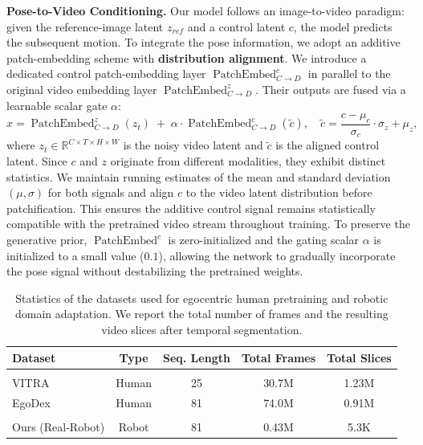\noindent \textbf{Pose-to-Video Conditioning.} 
Our model follows an image-to-video paradigm: given the reference-image latent $z_{ref}$ and a control latent $c$, the model predicts the subsequent motion. To integrate the pose information, we adopt an additive patch-embedding scheme with \textbf{distribution alignment}. We introduce a dedicated control patch-embedding layer $\operatorname{PatchEmbed}^{c}_{C \rightarrow D}$ in parallel to the original video embedding layer $\operatorname{PatchEmbed}^{z}_{C \rightarrow D}$. Their outputs are fused via a learnable scalar gate $\alpha$:
\begin{equation}                                                                        
x = \operatorname{PatchEmbed}^{z}_{C \rightarrow D}(z_t) \;+\; \alpha \cdot \operatorname{PatchEmbed}^{c}_{C \rightarrow D}\!\left(\widetilde{c}\right),\quad       
\widetilde{c} = \frac{c - \mu_c}{\sigma_c} \cdot \sigma_z + \mu_z,
\label{eq:patchify_addplus}                                                             
\end{equation}
where $z_t \in \mathbb{R}^{C \times T \times H \times W}$ is the noisy video latent and $\widetilde{c}$ is the aligned control latent. Since $c$ and $z$ originate from different modalities, they exhibit distinct statistics. We maintain running estimates of the mean and standard deviation $(\mu, \sigma)$ for both signals and align $c$ to the video latent distribution before patchification. This ensures the additive control signal remains statistically compatible with the pretrained video stream throughout training. To preserve the generative prior, $\operatorname{PatchEmbed}^{c}$ is zero-initialized and the gating scalar $\alpha$ is initialized to a small value (\eg $0.1$), allowing the network to gradually incorporate the pose signal without destabilizing the pretrained weights.



\begin{table}[t]
    \centering
    \caption{Statistics of the datasets used for egocentric human pretraining and robotic domain adaptation. We report the total number of frames and the resulting video slices after temporal segmentation.}
    \label{tab:data}
    \small
    \begin{tabular}{lcccc}
        \toprule
        \textbf{Dataset} & \textbf{Type} & \textbf{Seq. Length} & \textbf{Total Frames} & \textbf{Total Slices} \\
        \midrule
        \rowcolor{gray!10} \multicolumn{5}{l}{\textit{Egocentric Human Pretraining}} \\
        VITRA~\citep{li2025scalable} & Human & 25 & 30.7M & 1.23M \\
        EgoDex~\citep{hoque2025egodex} & Human & 81 & 74.0M & 0.91M \\
        \midrule
        \rowcolor{gray!10} \multicolumn{5}{l}{\textit{Robotic Domain Adaptation}} \\
        Ours (Real-Robot) & Robot & 81 & 0.43M & 5.3K \\
        \bottomrule
    \end{tabular}
\end{table}



